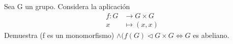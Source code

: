 \question 
Sea G un grupo. Considera la aplicación
\begin{align*}
f: G &\to G \times G\\
x &\mapsto (x,x)
\end{align*}
Demuestra (f es un monomorfismo) $\land ({f(G) \triangleleft {G \times G}} \iff G$ es abeliano.